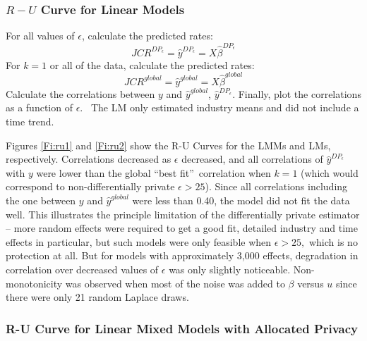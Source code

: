 \subsubsection{$R-U$ Curve for Linear Models}

{For all values of $\epsilon $, calculate the predicted rates: 
\begin{equation*}
JCR^{DP_{\epsilon }}=\hat{y}^{DP_{\epsilon }}=X\hat{\beta}^{DP_{\epsilon }} 
\end{equation*}%
For $k=1$ or all of the data, calculate the predicted rates: 
\begin{equation*}
JCR^{global}=\hat{y}^{global}=X\hat{\beta}^{global} 
\end{equation*}%
Calculate the correlations between $y$ and $\hat{y}^{global}$, $\hat{y}%
^{DP_{\epsilon }}$. Finally, plot the correlations as a function of $%
\epsilon $. \ The LM only estimated industry means and did not include a
time trend.}

Figures \ref{Fi:ru1} and \ref{Fi:ru2} show the R-U Curves for the LMMs and
LMs, respectively. Correlations decreased as $\epsilon $ decreased, and all
correlations of $\hat{y}^{DP_{\epsilon }}$ with $y$ were lower than the
global \textquotedblleft best fit\textquotedblright\ correlation when $k=1$
(which would correspond to non-differentially private $\epsilon >25$). Since
all correlations including the one between $y$ and $\hat{y}^{global}$ were
less than 0.40, the model did not fit the data well. This illustrates the
principle limitation of the differentially private estimator -- more random
effects were required to get a good fit, detailed industry and time effects
in particular, but such models were only feasible when $\epsilon >25,$ which
is no protection at all. But for models with approximately 3,000 effects,
degradation in correlation over decreased values of $\epsilon $ was only
slightly noticeable. Non-monotonicity was observed when most of the noise
was added to $\beta $ versus $u$ since there were only 21 random Laplace
draws.

\subsubsection{R-U Curve for Linear Mixed Models with Allocated Privacy}

